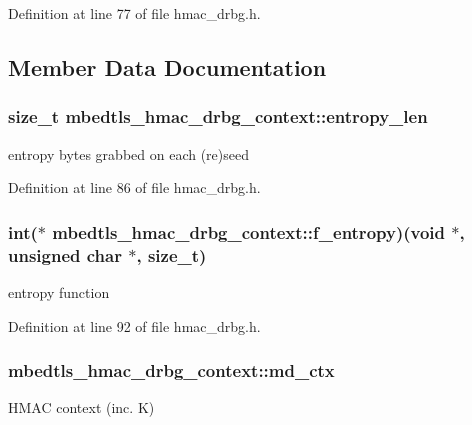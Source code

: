 Definition at line 77 of file hmac\-\_\-drbg.\-h.



\subsection{Member Data Documentation}
\hypertarget{structmbedtls__hmac__drbg__context_a137d68a6581248a2a6fbe06dae4a830b}{
\subsubsection[{entropy\-\_\-len}]{\setlength{\rightskip}{0pt plus 5cm}size\-\_\-t mbedtls\-\_\-hmac\-\_\-drbg\-\_\-context\-::entropy\-\_\-len}}\label{structmbedtls__hmac__drbg__context_a137d68a6581248a2a6fbe06dae4a830b}
entropy bytes grabbed on each (re)seed 

Definition at line 86 of file hmac\-\_\-drbg.\-h.

\hypertarget{structmbedtls__hmac__drbg__context_a8d1372acc13224e983b2e73a8fde9f64}{
\subsubsection[{f\-\_\-entropy}]{\setlength{\rightskip}{0pt plus 5cm}int($\ast$ mbedtls\-\_\-hmac\-\_\-drbg\-\_\-context\-::f\-\_\-entropy)(void $\ast$, unsigned char $\ast$, size\-\_\-t)}}\label{structmbedtls__hmac__drbg__context_a8d1372acc13224e983b2e73a8fde9f64}
entropy function 

Definition at line 92 of file hmac\-\_\-drbg.\-h.

\hypertarget{structmbedtls__hmac__drbg__context_ae5ab42fe02b5f9d26c5b4535e3614a4d}{
\subsubsection[{md\-\_\-ctx}]{ mbedtls\-\_\-hmac\-\_\-drbg\-\_\-context\-::md\-\_\-ctx}}\label{structmbedtls__hmac__drbg__context_ae5ab42fe02b5f9d26c5b4535e3614a4d}
H\-M\-A\-C context (inc. K) 

